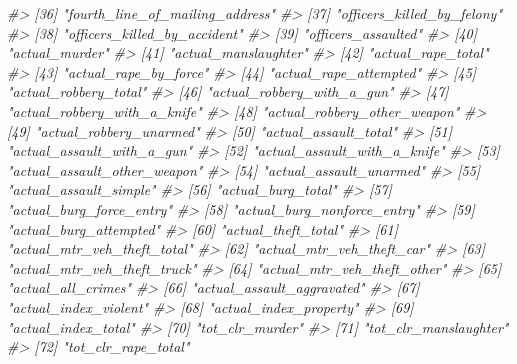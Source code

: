 \documentclass[
]{krantz}
\makeatletter
\newenvironment{Shaded}{\begin{snugshade}}{\end{snugshade}}
\newcommand{\CommentTok}[1]{\textcolor[rgb]{0.37,0.37,0.37}{\textit{#1}}}
\newenvironment{kframe}{%
\medskip{}
\setlength{\fboxsep}{.8em}
 \def\at@end@of@kframe{}%
 \ifinner\ifhmode%
  \def\at@end@of@kframe{\end{minipage}}%
  \begin{minipage}{\columnwidth}%
 \fi\fi%
 \def\FrameCommand##1{\hskip\@totalleftmargin \hskip-\fboxsep
 \colorbox{shadecolor}{##1}\hskip-\fboxsep
     \hskip-\linewidth \hskip-\@totalleftmargin \hskip\columnwidth}%
 \MakeFramed {\advance\hsize-\width
   \@totalleftmargin\z@ \linewidth\hsize
   \@setminipage}}%
 {\par\unskip\endMakeFramed%
 \at@end@of@kframe}
\renewenvironment{Shaded}{\begin{kframe}}{\end{kframe}}
\makeatother
\begin{document}
\begin{Shaded}
\begin{Highlighting}[]
\CommentTok{\#\textgreater{}  [36] "fourth\_line\_of\_mailing\_address"}
\CommentTok{\#\textgreater{}  [37] "officers\_killed\_by\_felony"     }
\CommentTok{\#\textgreater{}  [38] "officers\_killed\_by\_accident"   }
\CommentTok{\#\textgreater{}  [39] "officers\_assaulted"            }
\CommentTok{\#\textgreater{}  [40] "actual\_murder"                 }
\CommentTok{\#\textgreater{}  [41] "actual\_manslaughter"           }
\CommentTok{\#\textgreater{}  [42] "actual\_rape\_total"             }
\CommentTok{\#\textgreater{}  [43] "actual\_rape\_by\_force"          }
\CommentTok{\#\textgreater{}  [44] "actual\_rape\_attempted"         }
\CommentTok{\#\textgreater{}  [45] "actual\_robbery\_total"          }
\CommentTok{\#\textgreater{}  [46] "actual\_robbery\_with\_a\_gun"     }
\CommentTok{\#\textgreater{}  [47] "actual\_robbery\_with\_a\_knife"   }
\CommentTok{\#\textgreater{}  [48] "actual\_robbery\_other\_weapon"   }
\CommentTok{\#\textgreater{}  [49] "actual\_robbery\_unarmed"        }
\CommentTok{\#\textgreater{}  [50] "actual\_assault\_total"          }
\CommentTok{\#\textgreater{}  [51] "actual\_assault\_with\_a\_gun"     }
\CommentTok{\#\textgreater{}  [52] "actual\_assault\_with\_a\_knife"   }
\CommentTok{\#\textgreater{}  [53] "actual\_assault\_other\_weapon"   }
\CommentTok{\#\textgreater{}  [54] "actual\_assault\_unarmed"        }
\CommentTok{\#\textgreater{}  [55] "actual\_assault\_simple"         }
\CommentTok{\#\textgreater{}  [56] "actual\_burg\_total"             }
\CommentTok{\#\textgreater{}  [57] "actual\_burg\_force\_entry"       }
\CommentTok{\#\textgreater{}  [58] "actual\_burg\_nonforce\_entry"    }
\CommentTok{\#\textgreater{}  [59] "actual\_burg\_attempted"         }
\CommentTok{\#\textgreater{}  [60] "actual\_theft\_total"            }
\CommentTok{\#\textgreater{}  [61] "actual\_mtr\_veh\_theft\_total"    }
\CommentTok{\#\textgreater{}  [62] "actual\_mtr\_veh\_theft\_car"      }
\CommentTok{\#\textgreater{}  [63] "actual\_mtr\_veh\_theft\_truck"    }
\CommentTok{\#\textgreater{}  [64] "actual\_mtr\_veh\_theft\_other"    }
\CommentTok{\#\textgreater{}  [65] "actual\_all\_crimes"             }
\CommentTok{\#\textgreater{}  [66] "actual\_assault\_aggravated"     }
\CommentTok{\#\textgreater{}  [67] "actual\_index\_violent"          }
\CommentTok{\#\textgreater{}  [68] "actual\_index\_property"         }
\CommentTok{\#\textgreater{}  [69] "actual\_index\_total"            }
\CommentTok{\#\textgreater{}  [70] "tot\_clr\_murder"                }
\CommentTok{\#\textgreater{}  [71] "tot\_clr\_manslaughter"          }
\CommentTok{\#\textgreater{}  [72] "tot\_clr\_rape\_total"            }

\end{Highlighting}
\end{Shaded}
\end{document}
